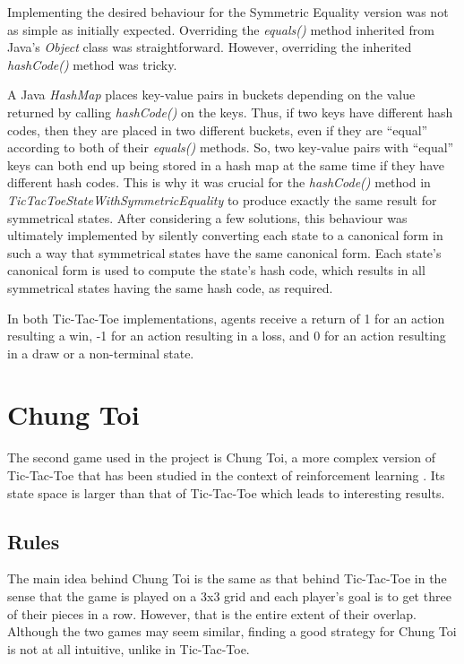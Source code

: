 \documentclass[11pt,a4paper]{report}
\begin{document}
Implementing the desired behaviour for the Symmetric Equality version was not as simple as initially expected. Overriding the \emph{equals()} method inherited from Java's \emph{Object} class was straightforward. However, overriding the inherited \emph{hashCode()} method was tricky.

A Java \emph{HashMap} places key-value pairs in buckets depending on the value returned by calling \emph{hashCode()} on the keys. Thus, if two keys have different hash codes, then they are placed in two different buckets, even if they are ``equal'' according to both of their \emph{equals()} methods. So, two key-value pairs with ``equal'' keys can both end up being stored in a hash map at the same time if they have different hash codes. This is why it was crucial for the \emph{hashCode()} method in \emph{TicTacToeStateWithSymmetricEquality} to produce exactly the same result for symmetrical states. After considering a few solutions, this behaviour was ultimately implemented by silently converting each state to a canonical form in such a way that symmetrical states have the same canonical form. Each state's canonical form is used to compute the state's hash code, which results in all symmetrical states having the same hash code, as required.

In both Tic-Tac-Toe implementations, agents receive a return of 1 for an action resulting a win, -1 for an action resulting in a loss, and 0 for an action resulting in a draw or a non-terminal state.


\section{Chung Toi}
\label{sec:ChungToi}

The second game used in the project is Chung Toi, a more complex version of Tic-Tac-Toe that has been studied in the context of reinforcement learning \cite{chung-toi-rl}. Its state space is larger than that of Tic-Tac-Toe which leads to interesting results.


\subsection{Rules}
\label{sec:ChungToiRules}

The main idea behind Chung Toi \cite{chung-toi-rules} is the same as that behind Tic-Tac-Toe in the sense that the game is played on a 3x3 grid and each player's goal is to get three of their pieces in a row. However, that is the entire extent of their overlap. Although the two games may seem similar, finding a good strategy for Chung Toi is not at all intuitive, unlike in Tic-Tac-Toe.
\end{document}
